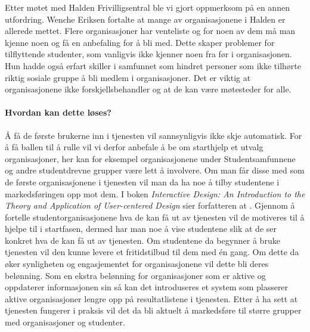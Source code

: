 Etter møtet med Halden Frivilligsentral ble vi gjort oppmerksom på en annen utfordring. Wenche Eriksen fortalte at mange av organisasjonene i Halden er allerede mettet. Flere organisasjoner har venteliste og for noen av dem må man kjenne noen og få en anbefaling for å bli med. Dette skaper problemer for tilflyttende studenter, som vanligvis ikke kjenner noen fra før i organisasjonen. Hun hadde også erfart skiller i samfunnet som hindret personer som ikke tilhørte riktig sosiale gruppe å bli medlem i organisasjoner. Det er viktig at organisasjonene ikke forskjellsbehandler og at de kan være møtesteder for alle. \cite{FRIVILLIGSENTRALEN-INTERVJU:21}


\paragraph{Hvordan kan dette løses?}
Å få de første brukerne inn i tjenesten vil sannsynligvis ikke skje automatisk. For å få ballen til å rulle vil vi derfor anbefale å be om starthjelp et utvalg organisasjoner, her kan for eksempel organisasjonene under Studentsamfunnene og andre studentdrevne grupper være lett å involvere. Om man får disse med som de første organisasjonene i tjenesten vil man da ha noe å tilby studentene i markedsføringen opp mot dem. I boken {\em Interactive Design: An Introduction to the Theory and Application of User-centered Design} sier forfatteren at  \cite[123]{INTERACTIVE-DESIGN:19}. Gjennom å fortelle studentorganisasjonene hva de kan få ut av tjenesten vil de motiveres til å hjelpe til i startfasen, dermed har man noe å vise studentene slik at de ser konkret hva de kan få ut av tjenesten. Om studentene da begynner å bruke tjenesten vil den kunne levere et fritidstilbud til dem med én gang. Om dette da øker synligheten og engasjementet for organisasjonene vil dette bli deres belønning. Som en ekstra belønning for organisasjoner som er aktive og oppdaterer informasjonen sin så kan det introduseres et system som plasserer aktive organisasjoner lengre opp på resultatlistene i tjenesten. Etter å ha sett at tjenesten fungerer i praksis vil det da bli aktuelt å markedsføre til større grupper med organisasjoner og studenter. 


